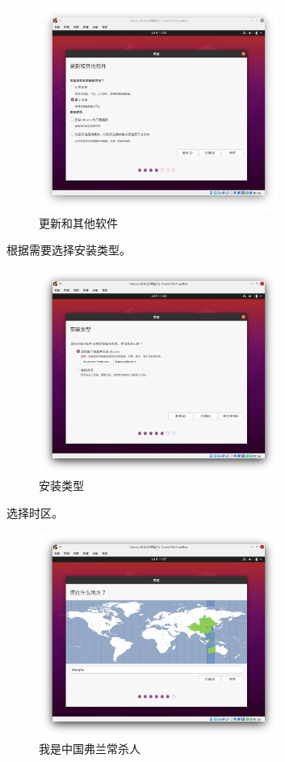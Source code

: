 \documentclass[UTF-8]{ctexart}
\begin{document}
				\begin{figure}[H]
					\centering
					\includegraphics[width=0.7\textwidth]{fig/ubuntu_install_4.png}
					\caption*{更新和其他软件}
				\end{figure}
			
				根据需要选择安装类型。
			
				\begin{figure}[H]
					\centering
					\includegraphics[width=0.7\textwidth]{fig/ubuntu_install_5.png}
					\caption*{安装类型}
				\end{figure}
			
				选择时区。
			
				\begin{figure}[H]
					\centering
					\includegraphics[width=0.7\textwidth]{fig/ubuntu_install_6.png}
					\caption*{我是中国弗兰常杀人}
				\end{figure}
			
\end{document}

